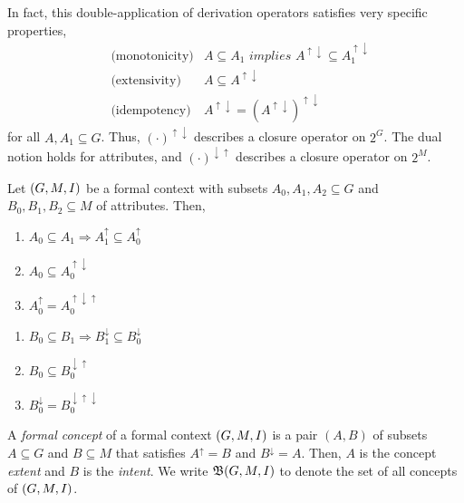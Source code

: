 In fact, this double-application of derivation operators satisfies very specific properties,
\begin{align}
  & \text{(monotonicity)} & A \subseteq A_1 \textit{ implies } A^{\uparrow \downarrow} \subseteq A_1^{\uparrow \downarrow} \\
  & \text{(extensivity)}  & A \subseteq A^{\uparrow \downarrow} \\
  & \text{(idempotency)}  & A^{\uparrow \downarrow} = (A^{\uparrow \downarrow})^{\uparrow \downarrow}
\end{align}
for all $A, A_1 \subseteq G$. Thus, $(\cdot)^{\uparrow \downarrow}$ describes a closure operator on $2^G$. The dual notion holds for attributes, and $(\cdot)^{\downarrow \uparrow}$ describes a closure operator on $2^M$.

\begin{proposition}
  \label{proposition:properties-about-derivation-operators}
  Let $(G,M,I)$ be a formal context with subsets $A_0, A_1, A_2 \subseteq G$ and $B_0, B_1, B_2 \subseteq M$ of attributes. Then,
  \begin{center}
    \begin{minipage}[t]{0.48\textwidth}
      \begin{enumerate}
        \item $A_0 \subseteq A_1 \Rightarrow A_1^\uparrow \subseteq A_0^\uparrow$
        \item $A_0 \subseteq A_0^{\uparrow \downarrow}$
        \item $A_0^\uparrow = A_0^{\uparrow \downarrow \uparrow}$
      \end{enumerate}
    \end{minipage}%
    \hfill
    \begin{minipage}[t]{0.48\textwidth}
      \begin{enumerate}
        \item $B_0 \subseteq B_1 \Rightarrow B_1^\downarrow \subseteq B_0^\downarrow$
        \item $B_0 \subseteq B_0^{\downarrow \uparrow}$
        \item $B_0^\downarrow = B_0^{\downarrow \uparrow \downarrow}$
      \end{enumerate}
    \end{minipage}
  \end{center}
\end{proposition}

\begin{definition}
  \label{definition:formal-concept}
  A \textit{formal concept} of a formal context $(G,M,I)$ is a pair $(A,B)$ of subsets $A \subseteq G$ and $B \subseteq M$ that satisfies $A^\uparrow = B$ and $B^\downarrow = A$. Then, $A$ is the concept \textit{extent} and $B$ is the \textit{intent}. We write $\mathfrak{B}(G,M,I)$ to denote the set of all concepts of $(G,M,I)$.
\end{definition}

